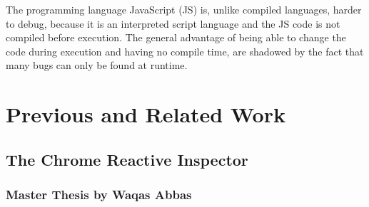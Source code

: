 
The programming language JavaScript (JS) is, unlike compiled languages, harder to debug, because it is an interpreted script language and the JS code is not compiled before execution. The general advantage of being able to change the code during execution and having no compile time, are shadowed by the fact that many bugs can only be found at runtime. 



\section{Previous and Related Work}
	\subsection{The Chrome Reactive Inspector}
		\subsubsection{Master Thesis by Waqas Abbas}
		
